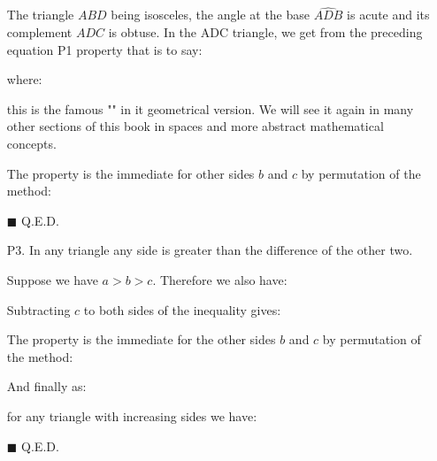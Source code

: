 \begin{enumerate}
\begin{dem}
		The triangle $ABD$ being isosceles, the angle at the base $\widehat{ADB}$ is acute and its complement $\widehat{ADC}$ is obtuse. In the ADC triangle, we get from the preceding equation P1 property that is to say:
		
		where:
		
		this is the famous "" in it geometrical version. We will see it again in many other sections of this book in spaces and more abstract mathematical concepts.
	
		The property is the immediate for other sides $b$ and $c$ by permutation of the method:
		
		\begin{flushright}
			$\blacksquare$  Q.E.D.
		\end{flushright}
		\end{dem}


		\item[P3.] In any triangle any side is greater than the difference of the other two.
		\begin{dem}
		Suppose we have $a>b>c$. Therefore we also have:
		
		Subtracting $c$ to both sides of the inequality gives:
		
		The property is the immediate for the other sides $b$ and $c$ by permutation of the method:
		
		And finally as:
		
		for any triangle with increasing sides we have:
		
		\begin{flushright}
			$\blacksquare$  Q.E.D.
		\end{flushright}
		\end{dem}
	\end{enumerate}
	
